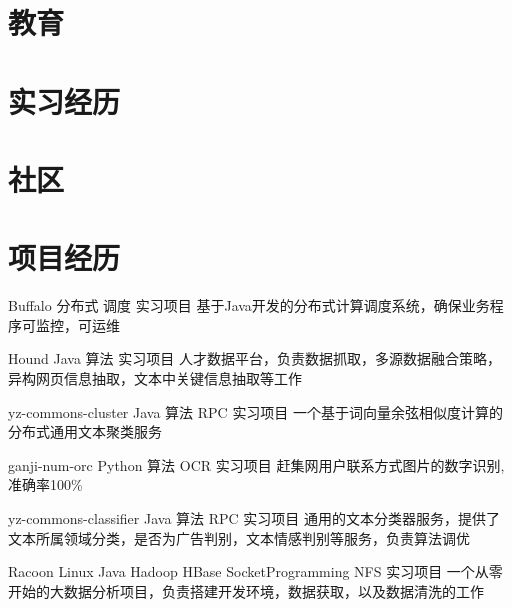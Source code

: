 \documentclass[11pt,a4paper]{moderncv}
\title{}               %
\begin{document}
\maketitle

\section{教育}

\section{实习经历}

\section{社区}

\section{项目经历}
\renewcommand{\baselinestretch}{1.2}

{Buffalo}
{分布式 调度}
{实习项目}{}
{基于Java开发的分布式计算调度系统，确保业务程序可监控，可运维}


{Hound}
{Java 算法}
{实习项目}{}
{人才数据平台，负责数据抓取，多源数据融合策略，异构网页信息抽取，文本中关键信息抽取等工作}


\vspace*{0.2\baselineskip}
{yz-commons-cluster}
{Java 算法 RPC}
{实习项目}{}
{一个基于词向量余弦相似度计算的分布式通用文本聚类服务}

\vspace*{0.2\baselineskip}
{ganji-num-orc}
{Python 算法 OCR}
{实习项目}{}
{赶集网用户联系方式图片的数字识别, 准确率100\%}

\vspace*{0.2\baselineskip}
{yz-commons-classifier}
{Java 算法 RPC}
{实习项目}{}
{通用的文本分类器服务，提供了文本所属领域分类，是否为广告判别，文本情感判别等服务，负责算法调优}

\vspace*{0.2\baselineskip}
{Racoon}
{Linux Java Hadoop HBase SocketProgramming NFS}
{实习项目}{}
{一个从零开始的大数据分析项目，负责搭建开发环境，数据获取，以及数据清洗的工作}
\end{document}
